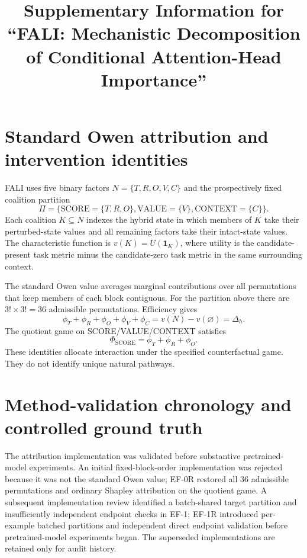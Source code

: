 \documentclass[pdflatex,sn-mathphys-ay]{sn-jnl}
\begin{document}
\title{Supplementary Information for ``FALI: Mechanistic Decomposition of Conditional Attention-Head Importance''}
\author*[1]{ }
\author[2]{ }
\author[3]{ }
\maketitle

\section{Standard Owen attribution and intervention identities}

FALI uses five binary factors $N=\{T,R,O,V,C\}$ and the prospectively fixed
coalition partition
\[
\Pi=\{\mathrm{SCORE}=\{T,R,O\},\mathrm{VALUE}=\{V\},\mathrm{CONTEXT}=\{C\}\}.
\]
Each coalition $K\subseteq N$ indexes the hybrid state in which members of $K$
take their perturbed-state values and all remaining factors take their intact-state
values. The characteristic function is $v(K)=U(\mathbf{1}_K)$, where utility is the
candidate-present task metric minus the candidate-zero task metric in the same
surrounding context.

The standard Owen value averages marginal contributions over all permutations
that keep members of each block contiguous. For the partition above there are
$3!\times 3!=36$ admissible permutations. Efficiency gives
\[
\phi_T+\phi_R+\phi_O+\phi_V+\phi_C
=v(N)-v(\varnothing)
=\Delta_h.
\]
The quotient game on SCORE/VALUE/CONTEXT satisfies
\[
\Phi_{\mathrm{SCORE}}=\phi_T+\phi_R+\phi_O.
\]
These identities allocate interaction under the specified counterfactual game.
They do not identify unique natural pathways.

\section{Method-validation chronology and controlled ground truth}

The attribution implementation was validated before substantive pretrained-model
experiments. An initial fixed-block-order implementation was rejected because it
was not the standard Owen value; EF-0R restored all 36 admissible permutations and
ordinary Shapley attribution on the quotient game. A subsequent implementation
review identified a batch-shared target partition and insufficiently independent
endpoint checks in EF-1; EF-1R introduced per-example batched partitions and
independent direct endpoint validation before pretrained-model experiments began.
The superseded implementations are retained only for audit history.
\end{document}
